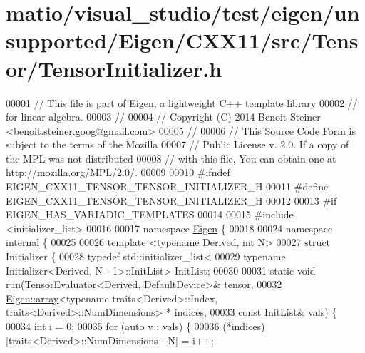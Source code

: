 \hypertarget{matio_2visual__studio_2test_2eigen_2unsupported_2_eigen_2_c_x_x11_2src_2_tensor_2_tensor_initializer_8h_source}{}\section{matio/visual\+\_\+studio/test/eigen/unsupported/\+Eigen/\+C\+X\+X11/src/\+Tensor/\+Tensor\+Initializer.h}
\label{matio_2visual__studio_2test_2eigen_2unsupported_2_eigen_2_c_x_x11_2src_2_tensor_2_tensor_initializer_8h_source}

\begin{DoxyCode}
00001 \textcolor{comment}{// This file is part of Eigen, a lightweight C++ template library}
00002 \textcolor{comment}{// for linear algebra.}
00003 \textcolor{comment}{//}
00004 \textcolor{comment}{// Copyright (C) 2014 Benoit Steiner <benoit.steiner.goog@gmail.com>}
00005 \textcolor{comment}{//}
00006 \textcolor{comment}{// This Source Code Form is subject to the terms of the Mozilla}
00007 \textcolor{comment}{// Public License v. 2.0. If a copy of the MPL was not distributed}
00008 \textcolor{comment}{// with this file, You can obtain one at http://mozilla.org/MPL/2.0/.}
00009 
00010 \textcolor{preprocessor}{#ifndef EIGEN\_CXX11\_TENSOR\_TENSOR\_INITIALIZER\_H}
00011 \textcolor{preprocessor}{#define EIGEN\_CXX11\_TENSOR\_TENSOR\_INITIALIZER\_H}
00012 
00013 \textcolor{preprocessor}{#if EIGEN\_HAS\_VARIADIC\_TEMPLATES}
00014 
00015 \textcolor{preprocessor}{#include <initializer\_list>}
00016 
00017 \textcolor{keyword}{namespace }\hyperlink{namespace_eigen}{Eigen} \{
00018 
00024 \textcolor{keyword}{namespace }\hyperlink{namespaceinternal}{internal} \{
00025 
00026 \textcolor{keyword}{template} <\textcolor{keyword}{typename} Derived, \textcolor{keywordtype}{int} N>
00027 \textcolor{keyword}{struct }Initializer \{
00028   \textcolor{keyword}{typedef} std::initializer\_list<
00029     \textcolor{keyword}{typename} Initializer<Derived, N - 1>::InitList> InitList;
00030 
00031   \textcolor{keyword}{static} \textcolor{keywordtype}{void} run(TensorEvaluator<Derived, DefaultDevice>& tensor,
00032                   \hyperlink{class_eigen_1_1array}{Eigen::array}<\textcolor{keyword}{typename} traits<Derived>::Index, traits<Derived>::NumDimensions>
      * indices,
00033                   \textcolor{keyword}{const} InitList& vals) \{
00034     \textcolor{keywordtype}{int} i = 0;
00035     \textcolor{keywordflow}{for} (\textcolor{keyword}{auto} v : vals) \{
00036       (*indices)[traits<Derived>::NumDimensions - N] = i++;

\end{DoxyCode}
